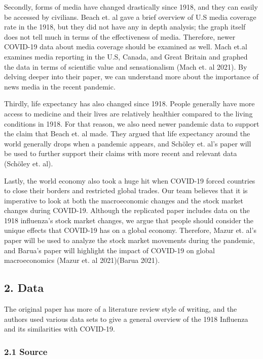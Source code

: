 \documentclass[
]{article}
\begin{document}
Secondly, forms of media have changed drastically since 1918, and they
can easily be accessed by civilians. Beach et. al gave a brief overview
of U.S media coverage rate in the 1918, but they did not have any in
depth analysis; the graph itself does not tell much in terms of the
effectiveness of media. Therefore, newer COVID-19 data about media
coverage should be examined as well. Mach et.al examines media reporting
in the U.S, Canada, and Great Britain and graphed the data in terms of
scientific value and sensationalism (Mach et. al 2021). By delving
deeper into their paper, we can understand more about the importance of
news media in the recent pandemic.

Thirdly, life expectancy has also changed since 1918. People generally
have more access to medicine and their lives are relatively healthier
compared to the living conditions in 1918. For that reason, we also need
newer pandemic data to support the claim that Beach et. al made. They
argued that life expectancy around the world generally drops when a
pandemic appears, and Schöley et. al's paper will be used to further
support their claims with more recent and relevant data (Schöley et.
al).

Lastly, the world economy also took a huge hit when COVID-19 forced
countries to close their borders and restricted global trades. Our team
believes that it is imperative to look at both the macroeconomic changes
and the stock market changes during COVID-19. Although the replicated
paper includes data on the 1918 influenza's stock market changes, we
argue that people should consider the unique effects that COVID-19 has
on a global economy. Therefore, Mazur et. al's paper will be used to
analyze the stock market movements during the pandemic, and Barua's
paper will highlight the impact of COVID-19 on global macroeconomics
(Mazur et. al 2021)(Barua 2021).

\hypertarget{data}{%
\subsection{2. Data}\label{data}}

The original paper has more of a literature review style of writing, and
the authors used various data sets to give a general overview of the
1918 Influenza and its similarities with COVID-19.

\hypertarget{source}{%
\subsubsection{2.1 Source}\label{source}}
\end{document}
